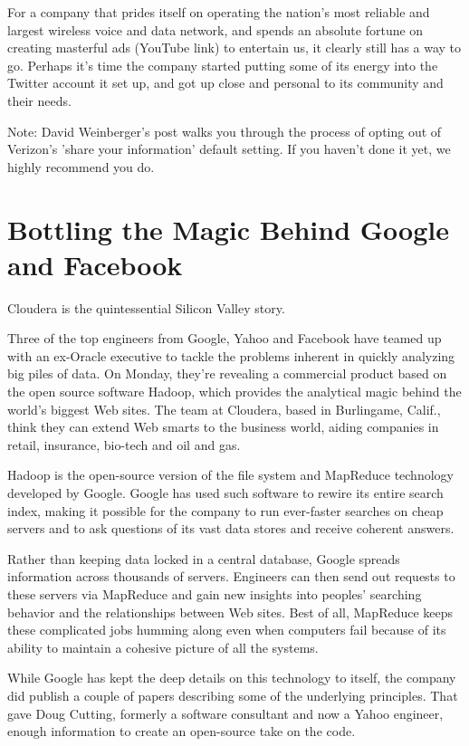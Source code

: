 \documentclass[12pt,a4paper,onecolumn]{article}
\begin{document}
\begin{CJK*}{GBK}{song}
For a company that prides itself on operating the nation's most reliable and largest wireless voice
and data network, and spends an absolute fortune on creating masterful ads (YouTube link) to
entertain us, it clearly still has a way to go. Perhaps it's time the company started putting some
of its energy into the Twitter account it set up, and got up close and personal to its community and
their needs.

Note: David Weinberger's post walks you through the process of opting out of Verizon's 'share your
information' default setting. If you haven't done it yet, we highly recommend you do.



\section{Bottling the Magic Behind Google and Facebook}

Cloudera is the quintessential Silicon Valley story.

Three of the top engineers from Google, Yahoo and Facebook have teamed up with an ex-Oracle
executive to tackle the problems inherent in quickly analyzing big piles of data. On Monday, they're
revealing a commercial product based on the open source software Hadoop, which provides the
analytical magic behind the world's biggest Web sites. The team at Cloudera, based in Burlingame,
Calif., think they can extend Web smarts to the business world, aiding companies in retail,
insurance, bio-tech and oil and gas.

Hadoop is the open-source version of the file system and MapReduce technology developed by Google.
Google has used such software to rewire its entire search index, making it possible for the company
to run ever-faster searches on cheap servers and to ask questions of its vast data stores and
receive coherent answers.

Rather than keeping data locked in a central database, Google spreads information across thousands
of servers. Engineers can then send out requests to these servers via MapReduce and gain new
insights into peoples' searching behavior and the relationships between Web sites. Best of all,
MapReduce keeps these complicated jobs humming along even when computers fail because of its ability
to maintain a cohesive picture of all the systems.

While Google has kept the deep details on this technology to itself, the company did publish a
couple of papers describing some of the underlying principles. That gave Doug Cutting, formerly a
software consultant and now a Yahoo engineer, enough information to create an open-source take on
the code.


\end{CJK*}
\end{document}
